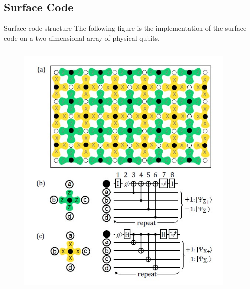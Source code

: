 \documentclass{beamer}
\begin{document}
    \subsection{Surface Code}
    \begin{frame}{Surface code structure}
        The following figure is the implementation of the surface code on a two-dimensional array of physical qubits.
        
        \begin{minipage}[0.65\textheight]{\textwidth}
        \begin{columns}[T]
            \begin{column}{0.4\textwidth}
                \begin{figure}[h]
                    \centering
                    \includegraphics[height=0.6\textheight]{./Images/surf-code-overview.jpg}
                \end{figure}
            \end{column}
            \begin{column}{0.6\textwidth}
\end{column}
\end{columns}
\end{minipage}
\end{frame}
\end{document}
